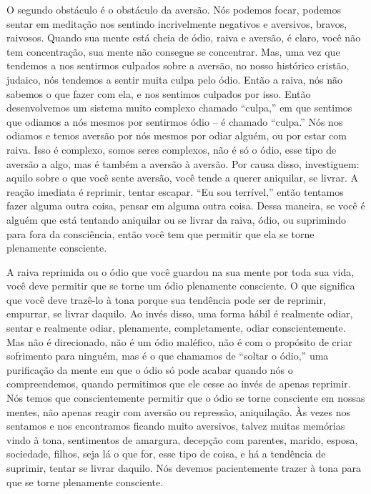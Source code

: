 O segundo obstáculo é o obstáculo da aversão. Nós podemos focar,
podemos sentar em meditação nos sentindo incrivelmente negativos e
aversivos, bravos, raivosos. Quando sua mente está cheia de ódio, raiva
e aversão, é claro, você não tem concentração, sua mente não consegue
se concentrar. Mas, uma vez que tendemos a nos sentirmos culpados sobre
a aversão, no nosso histórico cristão, judaico, nós tendemos a sentir
muita culpa pelo ódio. Então a raiva, nós não sabemos o que fazer com
ela, e nos sentimos culpados por isso. Então desenvolvemos um sistema
muito complexo chamado “culpa,” em que sentimos que odiamos a nós
mesmos por sentirmos ódio – é chamado “culpa.” Nós nos odiamos e temos
aversão por nós mesmos por odiar alguém, ou por estar com raiva. Isso é
complexo, somos seres complexos, não é só o ódio, esse tipo de aversão
a algo, mas é também a aversão à aversão. Por causa disso, investiguem:
aquilo sobre o que você sente aversão, você tende a querer aniquilar,
se livrar. A reação imediata é reprimir, tentar escapar. “Eu sou
terrível,” então tentamos fazer alguma outra coisa, pensar em alguma
outra coisa. Dessa maneira, se você é alguém que está tentando
aniquilar ou se livrar da raiva, ódio, ou suprimindo para fora da
consciência, então você tem que permitir que ela se torne plenamente
consciente.

A raiva reprimida ou o ódio que você guardou na sua mente por toda
sua vida, você deve permitir que se torne um ódio plenamente
consciente. O que significa que você deve trazê-lo à tona porque sua
tendência pode ser de reprimir, empurrar, se livrar daquilo. Ao invés
disso, uma forma hábil é realmente odiar, sentar e realmente odiar,
plenamente, completamente, odiar conscientemente. Mas não é
direcionado, não é um ódio maléfico, não é com o propósito de criar
sofrimento para ninguém, mas é o que chamamos de “soltar o ódio,” uma
purificação da mente em que o ódio só pode acabar quando nós o
compreendemos, quando permitimos que ele cesse ao invés de apenas
reprimir. Nós temos que conscientemente permitir que o ódio se torne
consciente em nossas mentes, não apenas reagir com aversão ou
repressão, aniquilação. Às vezes nos sentamos e nos encontramos ficando
muito aversivos, talvez muitas memórias vindo à tona, sentimentos de
amargura, decepção com parentes, marido, esposa, sociedade, filhos,
seja lá o que for, esse tipo de coisa, e há a tendência de suprimir,
tentar se livrar daquilo. Nós devemos pacientemente trazer à tona para
que se torne plenamente consciente. 

